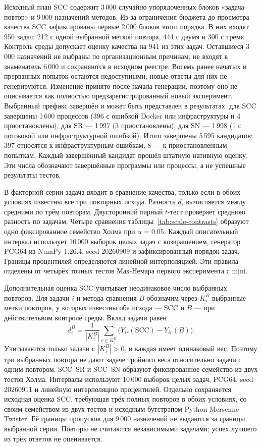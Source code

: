 Исходный план SCC содержит 3\,000 случайно упорядоченных блоков «задача--повтор» и 9\,000 назначений методов. Из-за ограничения бюджета до просмотра качества SCC зафиксированы первые 2\,000 блоков этого порядка. В них входят 956 задач: 212 с одной выбранной меткой повтора, 444 с двумя и 300 с тремя. Контроль среды допускает оценку качества на 941 из этих задач. Оставшиеся 3\,000 назначений не выбраны по организационным причинам, не входят в знаменатель 6\,000 и сохраняются в исходном реестре. Восемь ранее начатых и прерванных попыток остаются недоступными; новые ответы для них не генерируются. Изменение принято после начала генерации, поэтому оно не описывается как полностью предзарегистрированный новый эксперимент. Выбранный префикс завершён и может быть представлен в результатах: для SCC завершены 1\,600 процессов (396 с ошибкой Docker или инфраструктуры и 4 приостановлены), для SR --- 1\,997 (3 приостановлены), для SN --- 1\,998 (1 с потоковой или инфраструктурной ошибкой). Итого завершены 5\,595 кандидатов; 397 относятся к инфраструктурным ошибкам, 8 --- к приостановленным попыткам. Каждый завершённый кандидат прошёл штатную нативную оценку. Эти числа обозначают завершённые программы или процессы, а не успешные результаты тестов.

В факторной серии задача входит в сравнение качества, только если в обоих условиях известны все три повторных исхода. Разность $d_i$ вычисляется между средними по трём повторам. Двусторонний парный $t$-тест проверяет среднюю разность по задачам. Четыре сравнения таблицы~\ref{tab:scale-contrasts} образуют одно фиксированное семейство Холма при $\alpha=0.05$. Каждый описательный интервал использует 10\,000 выборок целых задач с возвращением, генератор PCG64 из NumPy 1.26.4, seed 20260909 и зафиксированный порядок задач. Границы процентилей определяются линейной интерполяцией. Эти правила отделены от четырёх точных тестов Мак-Немара первого эксперимента с mini.

Дополнительная оценка SCC учитывает неодинаковое число выбранных повторов. Для задачи $i$ и метода сравнения $B$ обозначим через $K_i^B$ выбранные метки повторов, у которых известны оба исхода --- SCC и $B$ --- при действительном контроле среды. Вклад задачи равен
\[
d_i^B=\frac{1}{|K_i^B|}\sum_{r\in K_i^B}
\bigl(Y_{ir}(\mathrm{SCC})-Y_{ir}(B)\bigr).
\]
Учитываются только задачи с $|K_i^B|>0$, и каждая имеет одинаковый вес. Поэтому три выбранных повтора не дают задаче тройного веса относительно задачи с одним повтором. SCC--SR и SCC--SN образуют фиксированное семейство из двух тестов Холма. Интервалы используют 10\,000 выборок целых задач, PCG64, seed 20260911 и линейную интерполяцию процентилей. Отдельно сохраняется исходная оценка SCC, требующая трёх полных повторов в обоих условиях, со своим семейством из двух тестов и исходным бутстрэпом Python Mersenne Twister. Её границы пропусков для 9\,000 назначений не выдаются за границы выбранной серии. Повторы не считаются независимыми задачами; успех лучшего из трёх ответов не оценивается.


